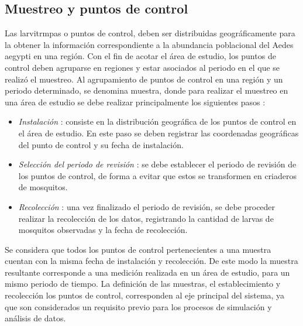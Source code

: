\subsection{Muestreo y puntos de control}
Las larvitrmpas o puntos de control, deben ser distribuidas geográficamente para la obtener la
información correspondiente a la abundancia poblacional del Aedes aegypti en una región. Con el
fin de acotar el área de estudio, los puntos de control deben agruparse en regiones y estar
asociados al periodo en el que se realizó el muestreo. Al agrupamiento de puntos de control en una
región y un periodo determinado, se denomina muestra, donde para realizar el muestreo en una área
de estudio se debe realizar principalmente los siguientes pasos :

\begin{itemize}
\item \textit{Instalación} : consiste en la distribución geográfica de los puntos de control en el área de estudio. En este paso se deben registrar las coordenadas geográficas del punto de control y su fecha de instalación.

\item \textit{Selección del periodo de revisión} : se debe establecer el periodo de revisión de los puntos de control, de forma a evitar que estos se transformen en criaderos de mosquitos.

\item \textit{Recolección} : una vez finalizado el periodo de revisión, se debe proceder realizar la recolección de los datos, registrando la cantidad de larvas de mosquitos observadas y la fecha de recolección.

\end{itemize}

Se considera que todos los puntos de control pertenecientes a una muestra cuentan con la misma
fecha de instalación y recolección. De este modo la muestra resultante corresponde a una medición
realizada en un área de estudio, para un mismo periodo de tiempo. La definición de las muestras,
el establecimiento y recolección los puntos de control, corresponden al eje principal del sistema,
ya que son considerados un requisito previo para los procesos de simulación y análisis de datos.
